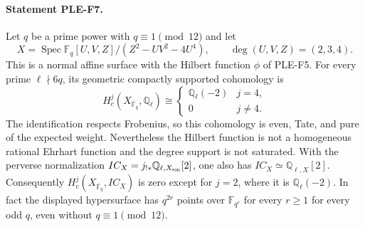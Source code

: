 \paragraph{Statement PLE-F7.}
Let $q$ be a prime power with $q\equiv1\pmod{12}$ and let
\[
 X=\operatorname{Spec}
 \mathbb F_q[U,V,Z]/(Z^2-UV^2-4U^4),
 \qquad \deg(U,V,Z)=(2,3,4).
\]
This is a normal affine surface with the Hilbert function $\phi$ of PLE-F5.
For every prime $\ell\nmid6q$, its geometric compactly supported
cohomology is
\[
 H_c^j(X_{\overline{\mathbb F}_q},\mathbb Q_\ell)
 \cong
 \begin{cases}\mathbb Q_\ell(-2)&j=4,\\0&j\ne4.\end{cases}
 \tag{PLE-F7}
\]
The identification respects Frobenius, so this cohomology is even,
Tate, and pure of the expected weight. Nevertheless the Hilbert function
is not a homogeneous rational Ehrhart function and the degree support
is not saturated. With the perverse normalization
$IC_X=j_{!*}\mathbb Q_{\ell,X_{\rm sm}}[2]$, one also has
$IC_X\simeq\mathbb Q_{\ell,X}[2]$. Consequently
$H_c^j(X_{\overline{\mathbb F}_q},IC_X)$ is zero except for
$j=2$, where it is $\mathbb Q_\ell(-2)$.
In fact the displayed hypersurface has
$q^{2r}$ points over $\mathbb F_{q^r}$ for every $r\ge1$ for every odd
$q$, even without $q\equiv1\pmod{12}$.

